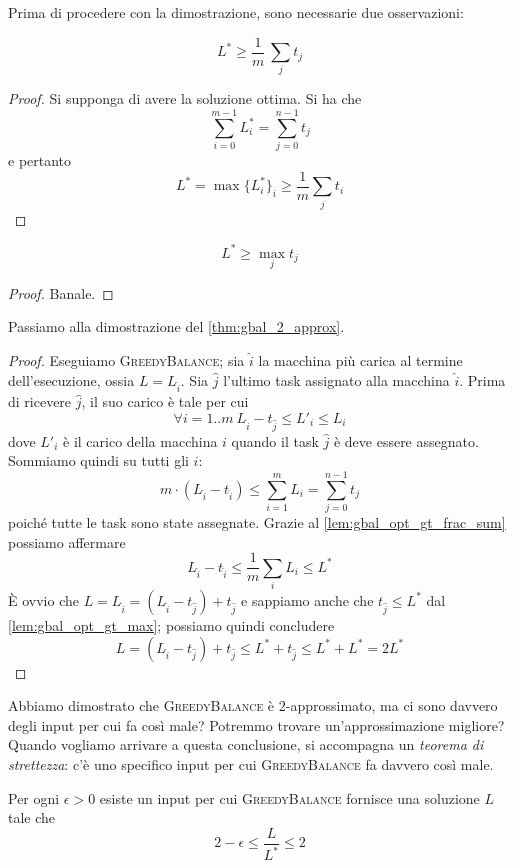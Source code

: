 \noindent
Prima di procedere con la dimostrazione, sono necessarie due osservazioni:

\begin{lemma}
	\label{lem:gbal_opt_gt_frac_sum}
	$$
		L^* \geq \frac{1}{m} ~ \sum_j t_j
	$$
\end{lemma}
\begin{proof}
	Si supponga di avere la soluzione ottima. Si ha che
	$$
		\sum_{i = 0}^{m-1} L^*_i = \sum_{j = 0}^{n-1} t_j
	$$
	e pertanto
	$$
		L^* = \max\{L^*_i\}_i \geq \frac{1}{m} \sum_j t_i
	$$
\end{proof}

\begin{lemma}
	\label{lem:gbal_opt_gt_max}
	$$
		L^* \geq \max_j t_j
	$$
\end{lemma}
\begin{proof}
	Banale.
\end{proof}

Passiamo alla dimostrazione del \cref{thm:gbal_2_approx}.
\begin{proof}
	Eseguiamo \textsc{GreedyBalance}; sia $\hat{i}$ la macchina più carica al termine
	dell'esecuzione, ossia $L = L_{\hat{i}}$. Sia $\hat{j}$ l'ultimo task assignato
	alla macchina $\hat{i}$. Prima di ricevere $\hat{j}$, il suo carico è tale per cui
	$$
		\forall i = 1..m ~ L_{\hat{i}} - t_{\hat{j}} \leq L'_i \leq L_i
	$$
	dove $L'_{i}$ è il carico della macchina $i$ quando il task $\hat{j}$ è
	deve essere assegnato. Sommiamo quindi su tutti gli $i$:
	$$
		m \cdot (L_{\hat{i}} - t_{\hat{i}}) \leq \sum_{i = 1}^{m} L_i = \sum_{j = 0}^{n-1} t_j
	$$
	poiché tutte le task sono state assegnate. Grazie al \cref{lem:gbal_opt_gt_frac_sum}
	possiamo affermare
	$$
		L_{\hat{i}} - t_{\hat{i}} \leq \frac{1}{m} \sum_i L_i \leq L^*
	$$
	\`E ovvio che $L = L_{\hat{i}} = (L_{\hat{i}} - t_{\hat{j}}) + t_{\hat{j}}$ e
	sappiamo anche che $t_{\hat{j}} \leq L^*$ dal \cref{lem:gbal_opt_gt_max};
	possiamo quindi concludere
	$$
		L = (L_{\hat{i}} - t_{\hat{j}}) + t_{\hat{j}} \leq L^* + t_{\hat{j}} \leq L^* + L^* = 2L^*
	$$
\end{proof}

Abbiamo dimostrato che \textsc{GreedyBalance} è $2$-approssimato, ma ci sono
davvero degli input per cui fa così male? Potremmo
trovare un'approssimazione migliore? Quando vogliamo arrivare a questa conclusione,
si accompagna un \textit{teorema di strettezza}: c'è uno specifico input per cui
\textsc{GreedyBalance} fa davvero così male.

\begin{theorem}\label{thm:gbal_strict}
	Per ogni $\epsilon > 0$ esiste un input per cui  \textsc{GreedyBalance} fornisce una
	soluzione $L$ tale che
	$$
		2 - \epsilon \leq \frac{L}{L^*} \leq 2
	$$
\end{theorem}

